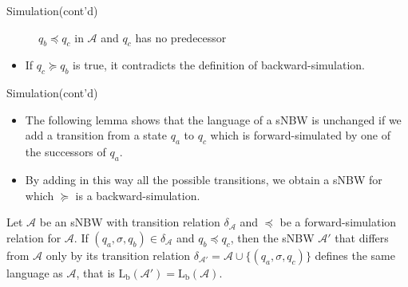 \documentclass[12pt]{beamer}
\begin{document}
\begin{frame}{Simulation(cont'd)}
\begin{figure}
		\caption{$q_{b} \preceq q_{c}$ in $\mathcal{A}$ and $q_{c}$ has no predecessor}
	\end{figure}

	
	\begin{itemize}
		\item If $q_{c} \succeq q_{b}$ is true, it contradicts the definition of backward-simulation.
	\end{itemize}
	
	
\end{frame}

\begin{frame}{Simulation(cont'd)}
	\label{lemma}
	\begin{itemize}
		\item The following lemma shows that the language of a sNBW is unchanged if we add a transition from a state $q_{a}$ to $q_{c}$ which is forward-simulated by one of the successors of $q_{a}$.
		\item By adding in this way all the possible transitions, we
		obtain a sNBW for which $\succeq$ is a backward-simulation.
	\end{itemize}
	\begin{lemma}
		Let $\mathcal{A}$ be an sNBW with transition relation $\delta_{\mathcal{A}}$ and $\preceq$ be a forward-simulation relation for $\mathcal{A}$. If $(q_{a}, \sigma, q_{b}) \in \delta_{\mathcal{A}}$ and $q_{b} \preceq q_{c}$, then the sNBW $\mathcal{A}'$ that differs from $\mathcal{A}$ only by its transition relation $\delta_{\mathcal{A}'} = \mathcal{A} \cup \{(q_{a}, \sigma, q_{c})\}$ defines the same language as $\mathcal{A}$, that is $\text{L}_\text{b}(\mathcal{A}') = \text{L}_\text{b}(\mathcal{A})$.
	\end{lemma}
\end{frame}
\end{document}
